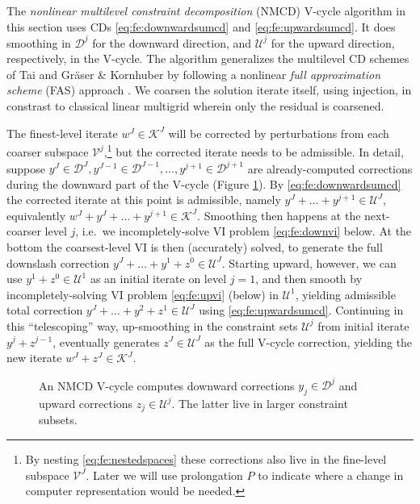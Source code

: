 \documentclass[letterpaper,final,12pt,reqno]{amsart}
\theoremstyle{cstyle}
\theoremstyle{cstyle*}
\theoremstyle{dstyle}
\numberwithin{equation}{section}
\numberwithin{figure}{section}
\numberwithin{table}{section}
\numberwithin{theorem}{section}
\begin{document}
The \emph{nonlinear multilevel constraint decomposition} (NMCD) V-cycle algorithm in this section uses CDs \eqref{eq:fe:downwardsumcd} and \eqref{eq:fe:upwardsumcd}.  It does smoothing in $\mathcal{D}^j$ for the downward direction, and $\mathcal{U}^j$ for the upward direction, respectively, in the V-cycle.  The algorithm generalizes the multilevel CD schemes of Tai \cite{Tai2003} and Gr\"aser \& Kornhuber \cite[Algorithm 4.7]{GraeserKornhuber2009} by following a nonlinear \emph{full approximation scheme} (FAS) approach \cite{BrandtLivne2011}.  We coarsen the solution iterate itself, using injection, in constrast to classical linear multigrid wherein only the residual is coarsened.

The finest-level iterate $w^J \in \mathcal{K}^J$ will be corrected by perturbations from each coarser subspace $\mathcal{V}^j$,\footnote{By nesting \eqref{eq:fe:nestedspaces} these corrections also live in the fine-level subspace $\mathcal{V}^J$.  Later we will use prolongation $P$ to indicate where a change in computer representation would be needed.} but the corrected iterate needs to be admissible.  In detail, suppose $y^J \in \mathcal{D}^J, y^{J-1} \in \mathcal{D}^{J-1}, \dots, y^{j+1} \in \mathcal{D}^{j+1}$ are already-computed corrections during the downward part of the V-cycle (Figure \ref{fig:nmcdvcycle}).  By \eqref{eq:fe:downwardsumcd} the corrected iterate at this point is admissible, namely $y^J + \dots + y^{j+1} \in \mathcal{U}^J$, equivalently $w^J + y^J + \dots + y^{j+1} \in \mathcal{K}^J$.  Smoothing then happens at the next-coarser level $j$, i.e.~we incompletely-solve VI problem \eqref{eq:fe:downvi} below.  At the bottom the coarsest-level VI is then (accurately) solved, to generate the full downslash correction $y^J + \dots + y^1 + z^0 \in \mathcal{U}^J$.  Starting upward, however, we can use $y^1+ z^0 \in \mathcal{U}^1$ as an initial iterate on level $j=1$, and then smooth by incompletely-solving VI problem \eqref{eq:fe:upvi} (below) in $\mathcal{U}^1$, yielding admissible total correction $y^J + \dots + y^2 + z^1 \in \mathcal{U}^J$ using \eqref{eq:fe:upwardsumcd}.  Continuing in this ``telescoping'' way, up-smoothing in the constraint sets $\mathcal{U}^j$ from initial iterate $y^j+z^{j-1}$, eventually generates $z^J\in \mathcal{U}^J$ as the full V-cycle correction, yielding the new iterate $w^J + z^J \in \mathcal{K}^J$.

\begin{figure}[ht]
\begin{center}

\end{center}
\caption{An NMCD V-cycle computes downward corrections $y_j \in \mathcal{D}^j$ and upward corrections $z_j\in\mathcal{U}^j$.  The latter live in larger constraint subsets.}
\label{fig:nmcdvcycle}
\end{figure}
\end{document}
